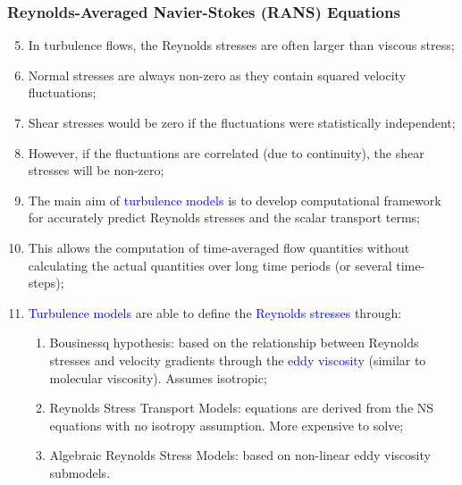 \documentclass[10pt,compress]{beamer}
\newcommand{\blue}{\textcolor{blue}}
\begin{document}
\begin{frame}
 \frametitle{Reynolds-Averaged Navier-Stokes (RANS) Equations}
    \begin{enumerate}\setcounter{enumi}{4}%
       \item<1-> In turbulence flows, the Reynolds stresses are often larger than viscous stress;
       \item<1-> Normal stresses are always non-zero as they contain squared velocity fluctuations;
       \item<1-> Shear stresses would be zero if the fluctuations were statistically independent;
       \item<1-> However, if the fluctuations are correlated (due to continuity), the shear stresses will be non-zero;
       \item<2-> The main aim of \blue{turbulence models} is to develop computational framework for accurately predict Reynolds stresses and the scalar transport terms;
       \item<2-> This allows the computation of time-averaged flow quantities without calculating the actual quantities over long time periods (or several time-steps);
       \item<3-> \blue{Turbulence models} are able to define the \blue{Reynolds stresses} through:
           \begin{enumerate}
                \item<3-> Bousinessq hypothesis: based on the relationship between Reynolds stresses and velocity gradients through the \blue{eddy viscosity} (similar to molecular viscosity). Assumes isotropic;
                \item<3-> Reynolds Stress Transport Models: equations are derived from the NS equations with no isotropy assumption. More expensive to solve; 
                \item<3-> Algebraic Reynolds Stress Models: based on non-linear eddy viscosity submodels.
                 
           \end{enumerate}
    \end{enumerate} 
\end{frame}
\end{document}
